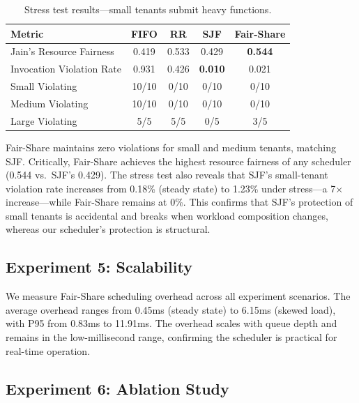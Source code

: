 \documentclass[runningheads]{llncs}
\begin{document}
\begin{table}[!ht]
\centering
\caption{Stress test results---small tenants submit heavy functions.}\label{tab:stress}
\small
\begin{tabular}{@{}lcccc@{}}
\toprule
\textbf{Metric} & \textbf{FIFO} & \textbf{RR} & \textbf{SJF} & \textbf{Fair-Share} \\
\midrule
Jain's Resource Fairness & 0.419 & 0.533 & 0.429 & \textbf{0.544} \\
Invocation Violation Rate & 0.931 & 0.426 & \textbf{0.010} & 0.021 \\
\midrule
Small Violating & 10/10 & 0/10 & 0/10 & 0/10 \\
Medium Violating & 10/10 & 0/10 & 0/10 & 0/10 \\
Large Violating & 5/5 & 5/5 & 0/5 & 3/5 \\
\bottomrule
\end{tabular}
\end{table}

Fair-Share maintains zero violations for small and medium tenants, matching SJF. Critically, Fair-Share achieves the highest resource fairness of any scheduler (0.544 vs.\ SJF's 0.429). The stress test also reveals that SJF's small-tenant violation rate increases from 0.18\% (steady state) to 1.23\% under stress---a 7$\times$ increase---while Fair-Share remains at 0\%. This confirms that SJF's protection of small tenants is accidental and breaks when workload composition changes, whereas our scheduler's protection is structural.

\subsection{Experiment 5: Scalability}

We measure Fair-Share scheduling overhead across all experiment scenarios. The average overhead ranges from 0.45ms (steady state) to 6.15ms (skewed load), with P95 from 0.83ms to 11.91ms. The overhead scales with queue depth and remains in the low-millisecond range, confirming the scheduler is practical for real-time operation.

\subsection{Experiment 6: Ablation Study}\label{sec:ablation}
\end{document}
